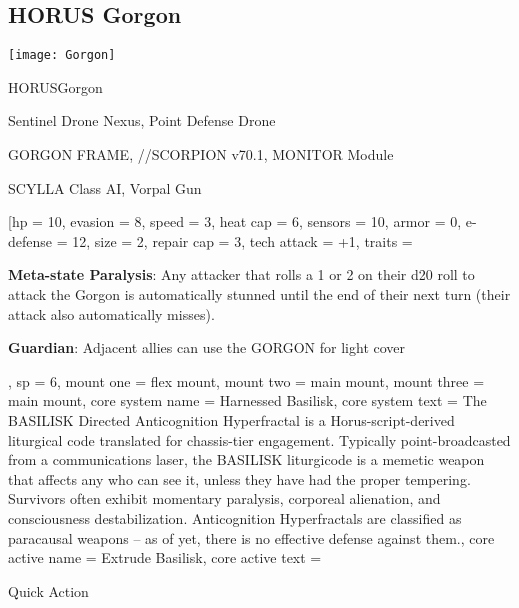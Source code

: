 \subsection{HORUS Gorgon}

\begin{center}
    \texttt{[image: Gorgon]}
\end{center}

\begin{mech}{HORUS}{Gorgon}


\begin{license}
\item Sentinel Drone Nexus, Point Defense Drone
\item GORGON FRAME,  //SCORPION v70.1, MONITOR Module
\item SCYLLA Class AI, Vorpal Gun
\end{license}


\frameBox
[hp = 10,
evasion = 8,
speed = 3,
heat cap = 6,
sensors = 10,
armor = 0,
e-defense = 12,
size = 2,
repair cap = 3,
tech attack = +1,
traits = {
     \textbf{Meta-state Paralysis}: Any attacker that rolls a 1 or 2 on their d20 roll to attack the Gorgon is automatically stunned until the end of their next turn (their attack also automatically misses).

     \textbf{Guardian}: Adjacent allies can use the GORGON for light cover
     },
sp = 6,
mount one = flex mount,
mount two = main mount,
mount three = main mount,
core system name = Harnessed Basilisk,
core system text = {The BASILISK Directed Anticognition Hyperfractal is a Horus-script-derived liturgical code translated for chassis-tier engagement. Typically point-broadcasted from a communications laser, the BASILISK liturgicode is a memetic weapon that affects any who can see it, unless they have had the proper tempering. Survivors often exhibit momentary paralysis, corporeal alienation, and consciousness destabilization. Anticognition Hyperfractals are classified as paracausal weapons -- as of yet, there is no effective defense against them.},
core active name = Extrude Basilisk,
core active text = {Quick Action

}
\end{mech}

